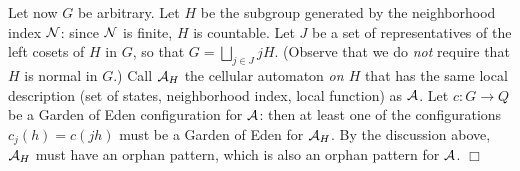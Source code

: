 \documentclass[12pt]{article}
\begin{document}
Let now $G$ be arbitrary.
Let $H$ be the subgroup generated by the neighborhood index $\mathcal{N}$:
since $\mathcal{N}$ is finite, $H$ is countable.
Let $J$ be a set of representatives of the left cosets of $H$ in $G$,
so that
\begin{math}
G = \bigsqcup_{j \in  J} jH.
\end{math}
(Observe that we do \emph{not} require that $H$ is normal in $G$.)
Call $\mathcal{A}_H$ the cellular automaton \emph{on $H$}
that has the same local description
(set of states, neighborhood index, local function) as $\mathcal{A}$.
Let $c : G \to Q$ be a Garden of Eden configuration for $\mathcal{A}$:
then at least one of the configurations
\begin{math}
c_j(h) = c(jh)
\end{math}
must be a Garden of Eden for $\mathcal{A}_H$.
By the discussion above, $\mathcal{A}_H$ must have an orphan pattern,
which is also an orphan pattern for $\mathcal{A}$.
\hfill $\Box$

\end{document}
